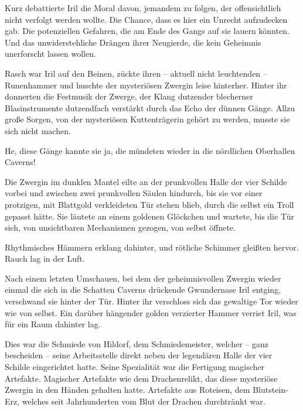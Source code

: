 Kurz debattierte Iril die Moral davon, jemandem zu folgen, der offensichtlich nicht verfolgt werden wollte. Die Chance, dass es hier ein Unrecht aufzudecken gab. Die potenziellen Gefahren, die am Ende des Gangs auf sie lauern könnten. Und das unwiderstehliche Drängen ihrer Neugierde, die kein Geheimnis unerforscht lassen wollen.

Rasch war Iril auf den Beinen, zückte ihren – aktuell nicht leuchtenden – Runenhammer und huschte der mysteriösen Zwergin leise hinterher. Hinter ihr donnerten die Festmusik der Zwerge, der Klang dutzender blecherner Blasinstrumente dutzendfach verstärkt durch das Echo der dünnen Gänge. Allzu große Sorgen, von der mysteriösen Kuttenträgerin gehört zu werden, musste sie sich nicht machen.

He, diese Gänge kannte sie ja, die mündeten wieder in die nördlichen Oberhallen Caverns!

Die Zwergin im dunklen Mantel eilte an der prunkvollen Halle der vier Schilde vorbei und zwischen zwei prunkvollen Säulen hindurch, bis sie vor einer protzigen, mit Blattgold verkleideten Tür stehen blieb, durch die selbst ein Troll gepasst hätte. Sie läutete an einem goldenen Glöckchen und wartete, bis die Tür sich, von unsichtbaren Mechanismen gezogen, von selbst öffnete.

Rhythmisches Hämmern erklang dahinter, und rötliche Schimmer gleißten hervor. Rauch lag in der Luft.

Nach einem letzten Umschauen, bei dem der geheimnisvollen Zwergin wieder einmal die sich in die Schatten Caverns drückende Gwundernase Iril entging, verschwand sie hinter der Tür. Hinter ihr verschloss sich das gewaltige Tor wieder wie von selbst. Ein darüber hängender golden verzierter Hammer verriet Iril, was für ein Raum dahinter lag.

Dies war die Schmiede von Hildorf, dem Schmiedemeister, welcher – ganz bescheiden – seine Arbeitsstelle direkt neben der legendären Halle der vier Schilde eingerichtet hatte. Seine Spezialität war die Fertigung magischer Artefakte. Magischer Artefakte wie dem Drachenrelikt, das diese mysteriöse Zwergin in den Händen gehalten hatte. Artefakte aus Roteisen, dem Blutstein-Erz, welches seit Jahrhunderten vom Blut der Drachen durchtränkt war.

